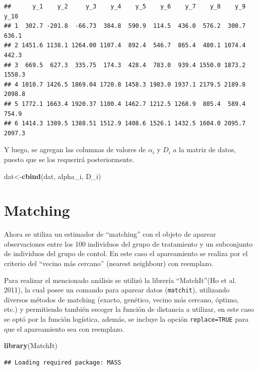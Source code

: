 \documentclass[]{article}
\newenvironment{Shaded}{\begin{snugshade}}{\end{snugshade}}
\newcommand{\KeywordTok}[1]{\textcolor[rgb]{0.13,0.29,0.53}{\textbf{{#1}}}}
\newcommand{\NormalTok}[1]{{#1}}
\begin{document}
\begin{verbatim}
##      y_1    y_2     y_3    y_4    y_5    y_6    y_7    y_8    y_9   y_10
## 1  302.7 -201.8  -66.73  384.8  590.9  114.5  436.0  576.2  300.7  636.1
## 2 1451.6 1138.1 1264.00 1107.4  892.4  546.7  865.4  480.1 1074.4  442.3
## 3  669.5  627.3  335.75  174.3  428.4  783.0  939.4 1550.0 1873.2 1558.3
## 4 1010.7 1426.5 1869.04 1720.8 1458.3 1983.0 1937.1 2179.5 2189.8 2098.8
## 5 1772.1 1663.4 1920.37 1100.4 1462.7 1212.5 1268.9  805.4  589.4  754.9
## 6 1414.3 1389.5 1388.51 1512.9 1408.6 1526.1 1432.5 1604.0 2095.7 2097.3
\end{verbatim}

Y luego, se agregan las columnas de valores de $\alpha_{i}$ y $D_{i}$ a
la matriz de datos, puesto que se los requerirá posteriormente.

\begin{Shaded}
\begin{Highlighting}[]
\NormalTok{dat<-}\KeywordTok{cbind}\NormalTok{(dat, alpha_i, D_i)}
\end{Highlighting}
\end{Shaded}

\section{Matching}\label{matching}

Ahora se utiliza un estimador de ``matching'' con el objeto de aparear
observaciones entre los 100 individuos del grupo de tratamiento y un
subconjunto de individuos del grupo de contol. En este caso el
apareamiento se realiza por el criterio del ``vecino más cercano''
(nearest neighbour) con reemplazo.

Para realizar el mencionado análisis se utilizó la librería
``MatchIt''(Ho et al. 2011), la cual posee un comando para aparear datos
(\texttt{matchit}), utilizando diversos métodos de matching (exacto,
genético, vecino más cercano, óptimo, etc.) y permitiendo también
escoger la función de distancia a utilizar, en este caso se optó por la
función logística, además, se incluye la opción \texttt{replace=TRUE}
para que el apareamiento sea con reemplazo.

\begin{Shaded}
\begin{Highlighting}[]
\KeywordTok{library}\NormalTok{(MatchIt)}
\end{Highlighting}
\end{Shaded}

\begin{verbatim}
## Loading required package: MASS
\end{verbatim}
\end{document}
